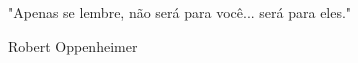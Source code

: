 \thispagestyle{empty}

\mbox{} \vspace{20cm}

\begin{flushright}
    "Apenas se lembre, não será para você... será para eles."
    
    Robert Oppenheimer
\end{flushright}
